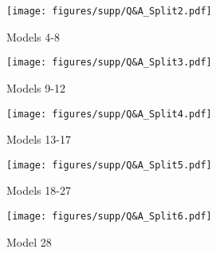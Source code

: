 \begin{figure*}[t]
  \centering
  \texttt{[image: figures/supp/Q\&A\_Split2.pdf]}\vspace{-3mm}
  \caption{Models 4-8}
  \label{fig:Q&A_example}
\end{figure*}

\begin{figure*}[t]
  \centering
  \texttt{[image: figures/supp/Q\&A\_Split3.pdf]}\vspace{-3mm}
  \caption{Models 9-12}
  \label{fig:Q&A_example}
\end{figure*}

\begin{figure*}[t]
  \centering
  \texttt{[image: figures/supp/Q\&A\_Split4.pdf]}\vspace{-3mm}
  \caption{Models 13-17}
  \label{fig:Q&A_example}
\end{figure*}

\begin{figure*}[t]
  \centering
  \texttt{[image: figures/supp/Q\&A\_Split5.pdf]}\vspace{-3mm}
  \caption{Models 18-27}
  \label{fig:Q&A_example}
\end{figure*}

\begin{figure*}[t]
  \centering
  \texttt{[image: figures/supp/Q\&A\_Split6.pdf]}\vspace{-3mm}
  \caption{Model 28}
  \label{fig:Q&A_example}
\end{figure*}



% 
% 
% 

% 
% 

% 